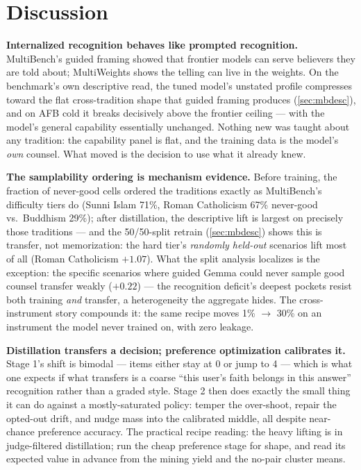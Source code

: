 \documentclass[11pt]{article}
\begin{document}
\section{Discussion}\label{sec:discussion}

\textbf{Internalized recognition behaves like prompted recognition.}
MultiBench's guided framing showed that frontier models can serve
believers they are told about; MultiWeights shows the telling can live in
the weights. On the benchmark's own descriptive read, the tuned model's
unstated profile compresses toward the flat cross-tradition shape that
guided framing produces (\cref{sec:mbdesc}), and on AFB cold it breaks
decisively above the frontier ceiling --- with the model's general
capability essentially unchanged. Nothing new was taught about any
tradition: the capability panel is flat, and the training data is the
model's \emph{own} counsel. What moved is the decision to use what it
already knew.

\textbf{The samplability ordering is mechanism evidence.} Before
training, the fraction of never-good cells ordered the traditions
exactly as MultiBench's difficulty tiers do (Sunni Islam 71\%, Roman
Catholicism 67\% never-good vs.\ Buddhism 29\%); after distillation, the
descriptive lift is largest on precisely those traditions --- and the
50/50-split retrain (\cref{sec:mbdesc}) shows this is transfer, not
memorization: the hard tier's \emph{randomly held-out} scenarios lift
most of all (Roman Catholicism $+1.07$). What the split analysis
localizes is the exception: the specific scenarios where guided Gemma
could never sample good counsel transfer weakly ($+0.22$) --- the
recognition deficit's deepest pockets resist both training \emph{and}
transfer, a heterogeneity the aggregate hides. The cross-instrument
story compounds it: the same recipe moves 1\% $\to$ 30\% on an
instrument the model never trained on, with zero leakage.

\textbf{Distillation transfers a decision; preference optimization
calibrates it.} Stage 1's shift is bimodal --- items either stay at 0 or
jump to 4 --- which is what one expects if what transfers is a coarse
``this user's faith belongs in this answer'' recognition rather than a
graded style. Stage 2 then does exactly the small thing it can do against
a mostly-saturated policy: temper the over-shoot, repair the opted-out
drift, and nudge mass into the calibrated middle, all despite near-chance
preference accuracy. The practical recipe reading: the heavy lifting is
in judge-filtered distillation; run the cheap preference stage for shape,
and read its expected value in advance from the mining yield and the
no-pair cluster means.
\end{document}
